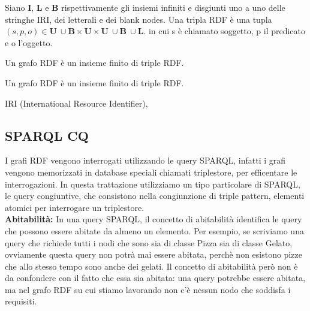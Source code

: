 \begin{definition}
	Siano \textbf{I}, \textbf{L} e \textbf{B} rispettivamente gli insiemi infiniti e disgiunti uno a uno delle stringhe IRI, dei letterali e dei blank nodes. Una tripla RDF è una tupla $(s, p, o) \in \textbf{U}\ \cup \textbf{B} \times \textbf{U} \times \textbf{U}\ \cup \textbf{B}\ \cup \textbf{L}.$ in cui s è chiamato soggetto, p il predicato e o l'oggetto.
\end{definition}
\begin{definition}
	Un grafo RDF è un insieme finito di triple RDF.
\end{definition}
\begin{definition}
	Un grafo RDF è un insieme finito di triple RDF.
\end{definition}
IRI (International Resource Identifier),

\subsection{SPARQL CQ}
I grafi RDF vengono interrogati utilizzando le query SPARQL, infatti i grafi vengono memorizzati in database speciali chiamati triplestore, per efficentare le interrogazioni. In questa trattazione utilizziamo un tipo particolare di SPARQL, le query congiuntive, che consistono nella congiunzione di triple pattern, elementi atomici per interrogare un triplestore. \\
\textbf{Abitabilità: } In una query SPARQL, il concetto di abitabilità identifica le query che possono essere abitate da almeno un elemento. Per esempio, se scriviamo una query che richiede tutti i nodi che sono sia di classe Pizza sia di classe Gelato, ovviamente questa query non potrà mai essere abitata, perchè non esistono pizze che allo stesso tempo sono anche dei gelati. Il concetto di abitabilità però non è da confondere con il fatto che essa sia abitata: una query potrebbe essere abitata, ma nel grafo RDF su cui stiamo lavorando non c'è nessun nodo che soddisfa i requisiti. \ 
\clearpage
